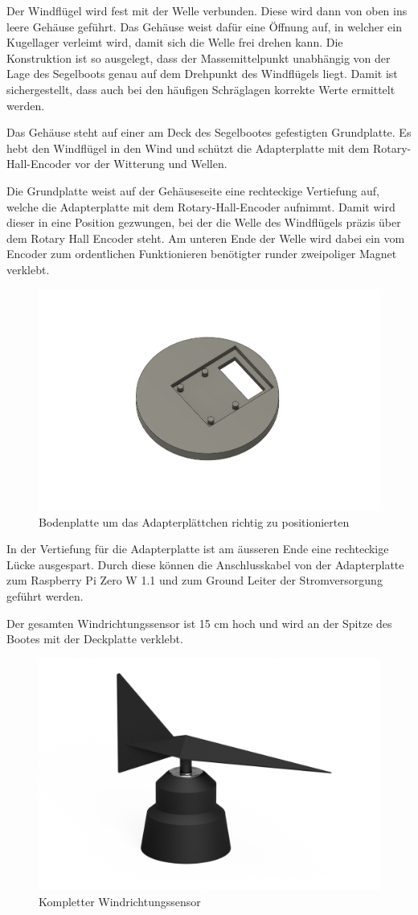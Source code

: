 Der Windflügel wird fest mit der Welle verbunden. Diese wird dann von oben ins leere Gehäuse geführt. Das Gehäuse weist dafür eine Öffnung auf, in welcher ein Kugellager verleimt wird, damit sich die Welle frei drehen kann. Die Konstruktion ist so ausgelegt, dass der Massemittelpunkt unabhängig von der Lage des Segelboots genau auf dem Drehpunkt des Windflügels liegt. Damit ist sichergestellt, dass auch bei den häufigen Schräglagen korrekte Werte ermittelt werden.

Das Gehäuse steht auf einer am Deck des Segelbootes gefestigten Grundplatte. Es hebt den Windflügel in den Wind und schützt die Adapterplatte mit dem Rotary-Hall-Encoder vor der Witterung und Wellen.

Die Grundplatte weist auf der Gehäuseseite eine rechteckige Vertiefung auf, welche die Adapterplatte mit dem Rotary-Hall-Encoder aufnimmt. Damit wird dieser in eine Position gezwungen, bei der die Welle des Windflügels präzis über dem Rotary Hall Encoder steht. Am unteren Ende der Welle wird dabei ein vom Encoder zum ordentlichen Funktionieren benötigter runder zweipoliger Magnet verklebt.
\begin{figure}[H]
    \centering
    \includegraphics[width=0.5\linewidth]{assets/image.png}
    \caption{Bodenplatte um das Adapterplättchen richtig zu positionierten}
    
\end{figure}
In der Vertiefung für die Adapterplatte ist am äusseren Ende eine rechteckige Lücke ausgespart. Durch diese können die Anschlusskabel von der Adapterplatte zum Raspberry Pi Zero W 1.1 und zum Ground Leiter der Stromversorgung geführt werden. 

Der gesamten Windrichtungssensor ist 15 cm hoch und wird an der Spitze des Bootes mit der Deckplatte verklebt.
\begin{figure}[H]
    \centering
    \includegraphics[width=0.75\linewidth]{assets/full_wind_sensor.png}
    \caption{Kompletter Windrichtungssensor}
    \label{fig:enter-label}
\end{figure}

